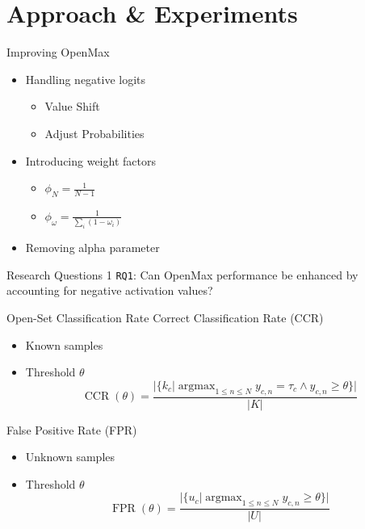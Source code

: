 \section{Approach \& Experiments}
\begin{frame}{Improving OpenMax}
	\begin{itemize}
		\item Handling negative logits
		      \begin{itemize}
			      \item Value Shift
			      \item Adjust Probabilities
		      \end{itemize}
		\item Introducing weight factors
		      \begin{itemize}
			      \item $ \phi_N = \frac{1}{N-1}$
			      \item $ \phi_{\omega} = \frac{1}{\sum_i (1 - \omega_i)}$
		      \end{itemize}
		\item Removing alpha parameter
	\end{itemize}
\end{frame}

\begin{frame}{Research Questions 1}
	\texttt{RQ1}: Can OpenMax performance be enhanced by accounting for negative activation values?
\end{frame}

\begin{frame}{Open-Set Classification Rate}
	Correct Classification Rate (CCR)
	\begin{itemize}
		\item Known samples
		\item Threshold $\theta$
		      \begin{equation}
			      \operatorname{CCR} (\theta) = \frac{| \{ k_{c} | \operatorname{argmax}_{1 \leq n \leq N} y_{c,n} = \tau_{c} \wedge y_{c,n} \geq \theta \}|}{ |K|}
		      \end{equation}
	\end{itemize}
	False Positive Rate (FPR)
	\begin{itemize}
		\item Unknown samples
		\item Threshold $\theta$
		      \begin{equation}
			      \operatorname{FPR}(\theta) = \frac{| \{ u_{c} | \operatorname{argmax}_{1 \leq n \leq N} y_{c,n} \geq \theta \}|}{ |U|}
		      \end{equation}
	\end{itemize}
\end{frame}

